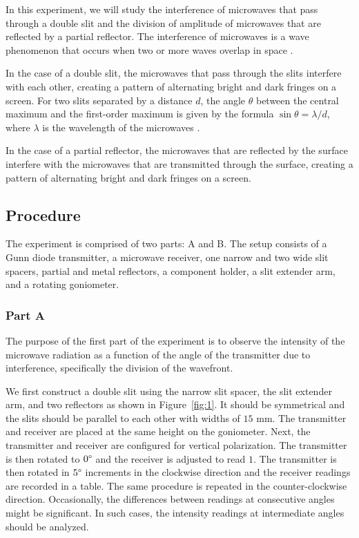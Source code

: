 \documentclass[10pt]{article}
\begin{document}
In this experiment, we will study the interference of microwaves that pass through a double slit and the division of amplitude of microwaves that are reflected by a partial reflector. The interference of microwaves is a wave phenomenon that occurs when two or more waves overlap in space \cite{Hecht_2017}. 

In the case of a double slit, the microwaves that pass through the slits interfere with each other, creating a pattern of alternating bright and dark fringes on a screen. For two slits separated by a distance $d$, the angle $\theta$ between the central maximum and the first-order maximum is given by the formula $\sin \theta = \lambda/d$, where $\lambda$ is the wavelength of the microwaves \cite{Pedrotti_2006}. 

In the case of a partial reflector, the microwaves that are reflected by the surface interfere with the microwaves that are transmitted through the surface, creating a pattern of alternating bright and dark fringes on a screen.

\subsection*{Procedure} 

The experiment is comprised of two parts: A and B. The setup consists of a Gunn diode transmitter, a microwave receiver, one narrow and two wide slit spacers, partial and metal reflectors, a component holder, a slit extender arm, and a rotating goniometer.

\subsubsection*{Part A}

The purpose of the first part of the experiment is to observe the intensity of the microwave radiation as a function of the angle of the transmitter due to interference, specifically the division of the wavefront.

We first construct a double slit using the narrow slit spacer, the slit extender arm, and two reflectors as shown in Figure~\ref{fig:1}. It should be symmetrical and the slits should be parallel to each other with widths of $15$ mm. The transmitter and receiver are placed at the same height on the goniometer. Next, the transmitter and receiver are configured for vertical polarization. The transmitter is then rotated to $0\degree$ and the receiver is adjusted to read $1$. The transmitter is then rotated in $5\degree$ increments in the clockwise direction and the receiver readings are recorded in a table. The same procedure is repeated in the counter-clockwise direction. Occasionally, the differences between readings at consecutive angles might be significant. In such cases, the intensity readings at intermediate angles should be analyzed.
\end{document}
